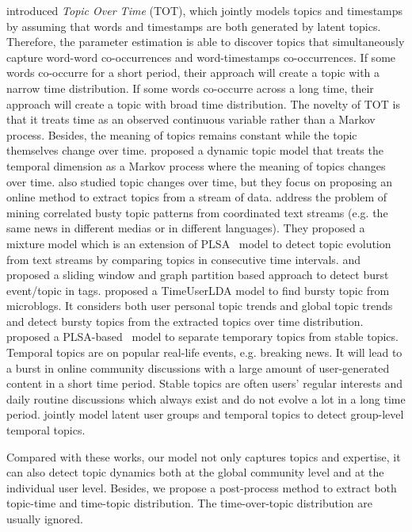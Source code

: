 \cite{wang2006topics} introduced \textit{Topic Over Time} (TOT), which jointly models topics and timestamps by assuming that words and timestamps are both generated by latent topics. Therefore, the parameter estimation is able to discover topics that simultaneously capture word-word co-occurrences and word-timestamps co-occurrences. If some words co-occurre for a short period, their approach will create a topic with a narrow time distribution. If some words co-occurre across a long time, their approach will create a topic with broad time distribution. The novelty of TOT  is that it treats time as an observed continuous variable rather than a Markov process. Besides, the meaning of topics remains constant while the topic themselves change over time. 
\cite{chp2blei2006dynamic} proposed a dynamic topic model that treats the temporal dimension as a Markov process where the meaning of topics changes over time. \cite{chp2onlineldaalsumait2008line} also studied topic changes over time, but they focus on proposing an online method to extract topics from a stream of data.
\cite{chp2wang2007mining} address the problem of mining correlated busty topic patterns from coordinated text streams (e.g. the same news in different medias or in different languages). They proposed a mixture model which is an extension of PLSA~\cite{hofmann1999probabilistic} model to detect topic evolution from text streams by comparing topics in consecutive time intervals. 
\cite{chp2yao2010detecting} and \cite{chp2yao2012bursty} proposed a sliding window and graph partition based approach to detect burst event/topic in tags. 
\cite{chp7diao2012finding} proposed a TimeUserLDA model to find bursty topic from microblogs. It considers both user personal topic trends and global topic trends and detect bursty topics from the extracted topics over time distribution.
\cite{yin2013unified}  proposed a PLSA-based~\cite{hofmann1999probabilistic} model to separate temporary topics from stable topics. Temporal topics are on popular real-life events, e.g. breaking news. It will lead to a burst in online community discussions with a large amount of user-generated content in a short time period. Stable topics are often users' regular interests and daily routine discussions which always exist and do not evolve a lot in a long time period. \cite{hu2014user} jointly model latent user groups and temporal topics to detect group-level temporal topics.

Compared with these works, our model not only captures topics and expertise, it  can also detect topic dynamics both at the global community level and at the individual user level. Besides, we propose a post-process method to extract both topic-time and time-topic distribution. The time-over-topic distribution are usually ignored.



